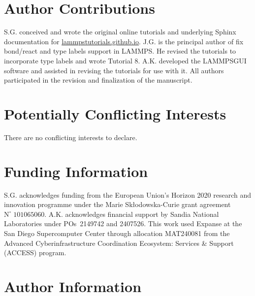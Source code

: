 \documentclass[9pt,tutorial]{livecoms}
\newcommand{\lmpcmd}[1]{\hspace{0pt}\colorbox{listing}{\textcolor{command}{\small{#1}}}\hspace{0pt}} %
\newcommand{\lammpsgui}{\textsf{LAMMPS\textendash GUI}}
\begin{document}
\section*{Author Contributions}

S.G. conceived and wrote the original online tutorials and underlying Sphinx documentation
for \href{https://lammpstutorials.github.io}{lammpstutorials.github.io}.
J.G. is the principal author of \lmpcmd{fix bond/react} and \lmpcmd{type labels}
support in LAMMPS.  He revised the tutorials to incorporate type labels and wrote Tutorial 8.
A.K. developed the \lammpsgui{} software and assisted in revising the
tutorials for use with it.  All authors participated in the revision and finalization
of the manuscript.

\section*{Potentially Conflicting Interests}

There are no conflicting interests to declare.

\section*{Funding Information}

S.G. acknowledges funding from the European Union's Horizon 2020 research and
innovation programme under the Marie Skłodowska-Curie grant agreement $\text{N}^\circ\;101065060$.
A.K. acknowledges financial support by Sandia National Laboratories under
POs~2149742 and 2407526. {\color{blue}This work used Expanse at the San Diego Supercomputer
Center through allocation MAT240081 from the Advanced Cyberinfrastructure Coordination
Ecosystem: Services \& Support (ACCESS) program.}

\section*{Author Information}
\makeorcid



\end{document}
